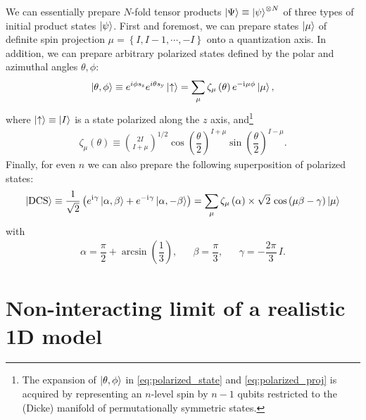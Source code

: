 \documentclass[nofootinbib,notitlepage,11pt]{revtex4-2}
\newcommand{\f}[2]{\dfrac{#1}{#2}} %
\newcommand{\p}[1]{\left(#1\right)} %
\renewcommand{\set}[1]{\left\{#1\right\}} %
\renewcommand{\i}{\mathrm{i}\mkern1mu} %
\newcommand{\1}{\mathds{1}}
\newcommand{\up}{\uparrow}
\newcommand{\y}{\text{y}}
\newcommand{\z}{\text{z}}
\newcommand{\DCS}{\text{DCS}}
\begin{document}
We can essentially prepare $N$-fold tensor products $\ket\Psi\equiv\ket\psi^{\otimes N}$ of three types of initial product states $\ket\psi$.
First and foremost, we can prepare states $\ket{\mu}$ of definite spin projection $\mu=\set{I,I-1,\cdots,-I}$ onto a quantization axis.
In addition, we can prepare arbitrary polarized states defined by the polar and azimuthal angles $\theta,\phi$:
\begin{align}
  \ket{\theta,\phi}
  \equiv e^{i\phi s_\z} e^{i\theta s_\y} \ket\up
  = \sum_\mu \zeta_\mu\p{\theta} e^{-\i\mu\phi} \ket\mu,
  \label{eq:polarized_state}
\end{align}
where $\ket\up\equiv\ket{I}$ is a state polarized along the $z$ axis, and\footnote{The expansion of $\ket{\theta,\phi}$ in \eqref{eq:polarized_state} and \eqref{eq:polarized_proj} is acquired by representing an $n$-level spin by $n-1$ qubits restricted to the (Dicke) manifold of permutationally symmetric states.}
\begin{align}
  \zeta_\mu\p{\theta} \equiv { 2I \choose I+\mu }^{1/2}
  \cos\p{\f{\theta}{2}}^{I+\mu} \sin\p{\f{\theta}{2}}^{I-\mu}.
  \label{eq:polarized_proj}
\end{align}
Finally, for even $n$ we can also prepare the following superposition of polarized states:
\begin{align}
  \ket{\DCS}
  \equiv \f1{\sqrt{2}}
  \p{e^{\i\gamma} \ket{\alpha,\beta}
    + e^{-\i\gamma} \ket{\alpha,-\beta}}
  = \sum_\mu \zeta_\mu\p{\alpha}
  \times \sqrt{2}\, \cos\p{\mu\beta-\gamma} \ket\mu
  \label{eq:double_state}
\end{align}
with
\begin{align}
  \alpha = \f{\pi}{2} + \arcsin\p{\f13},
  &&
  \beta = \f{\pi}{3},
  &&
  \gamma = -\f{2\pi}{3}\, I.
\end{align}

\section{Non-interacting limit of a realistic 1D model}
\end{document}
